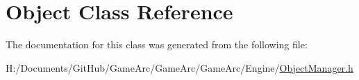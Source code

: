 \hypertarget{class_object}{\section{Object Class Reference}
\label{class_object}
}


The documentation for this class was generated from the following file\+:\begin{DoxyCompactItemize}
\item 
H\+:/\+Documents/\+Git\+Hub/\+Game\+Arc/\+Game\+Arc/\+Game\+Arc/\+Engine/\hyperlink{_object_manager_8h}{Object\+Manager.\+h}\end{DoxyCompactItemize}
